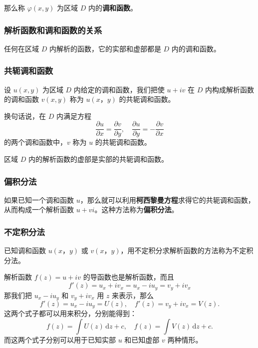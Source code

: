 那么称 \(\varphi(x,y)\) 为区域 \(D\) 内的\textbf{调和函数}。
\subsubsection{解析函数和调和函数的关系}
\label{解析函数和调和函数的关系}
任何在区域 \(D\) 内解析的函数，它的实部和虚部都是 \(D\) 内的调和函数。
\subsubsection{共轭调和函数}
\label{共轭调和函数}
设 \(u(x,y)\) 为区域 \(D\) 内给定的调和函数，我们把使 \(u+iv\) 在 \(D\)
内构成解析函数的调和函数 \(v(x,y)\) 称为 \(u(x，y)\) 的共轭调和函数。

换句话说，在 \(D\) 内满足方程 \[
\frac{\partial u}{\partial x} = \frac{\partial v}{\partial y} ,\quad \frac{\partial u}{\partial y} = -\frac{\partial v}{\partial x}
\] 的两个调和函数中，\(v\) 称为 \(u\) 的共轭调和函数。

\begin{tcolorbox}[title={Note},colback=red!5!white
,colframe=red!75!black
,colbacktitle=yellow!50!red
,coltitle=red!25!black, fonttitle=\bfseries,subtitle style={boxrule=0.4pt, colback=yellow!50!red!25!white}]
区域 \(D\) 内的解析函数的虚部是实部的共轭调和函数。

\end{tcolorbox}
\subsubsection{偏积分法}
\label{偏积分法}
如果已知一个调和函数
\(u\)，那么就可以利用\textbf{柯西黎曼方程}求得它的共轭调和函数，从而构成一个解析函数
\(u+vi\)。这种方法称为\textbf{偏积分法}。
\subsubsection{不定积分法}
\label{不定积分法}
已知调和函数 \(u(x，y)\) 或
\(v(x，y)\)，用不定积分求解析函数的方法称为不定积分法。

\begin{tcolorbox}[title={具体过程},colback=red!5!white
,colframe=red!75!black
,colbacktitle=yellow!50!red
,coltitle=red!25!black, fonttitle=\bfseries,subtitle style={boxrule=0.4pt, colback=yellow!50!red!25!white}]
解析函数 \(f(z)=u+iv\) 的导函数也是解析函数，而且
\[
f'(z) = u_x + iv_x = u_x - iu_y = v_y + iv_x
\]
那我们把 \(u_x - iu_y\) 和 \(v_y + iv_x\) 用 \(z\) 来表示，那么
\[
f'(z) = u_x - iu_y = U(z), \quad f'(z) = v_y + iv_x = V(z).
\]
这两个式子都可以用来积分，分别能得到：
\[
f(z) = \int U(z)\,\mathrm{d}z+c,\quad f(z) = \int V(z)\,\mathrm{d}z+c.
\]
而这两个式子分别可以用于已知实部 \(u\) 和已知虚部 \(v\) 两种情形。

\end{tcolorbox}
